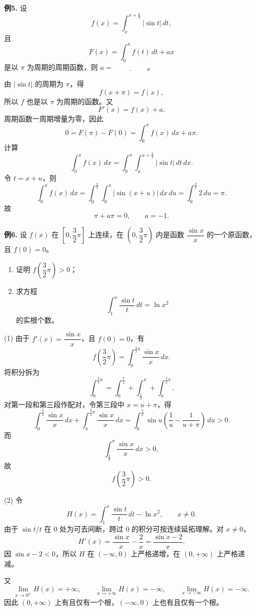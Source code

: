 \begin{problemblock}
\textbf{例5.} 设
\[
f(x)=\int_x^{x+\frac\pi2}|\sin t|\,dt,
\]
且
\[
F(x)=\int_0^x f(t)\,dt+ax
\]
是以 \(\pi\) 为周期的周期函数，则 \(a=\underline{\hspace{2cm}}\)。
\end{problemblock}
\begin{solutionblock}
由 \(|\sin t|\) 的周期为 \(\pi\)，得
\[
f(x+\pi)=f(x),
\]
所以 \(f\) 也是以 \(\pi\) 为周期的函数。又
\[
F'(x)=f(x)+a.
\]
周期函数一周期增量为零，因此
\[
0=F(\pi)-F(0)=\int_0^\pi f(x)\,dx+a\pi.
\]
计算
\[
\int_0^\pi f(x)\,dx
=\int_0^\pi\int_x^{x+\frac\pi2}|\sin t|\,dt\,dx.
\]
令 \(t=x+u\)，则
\[
\int_0^\pi f(x)\,dx
=\int_0^{\frac\pi2}\int_0^\pi|\sin(x+u)|\,dx\,du
=\int_0^{\frac\pi2}2\,du=\pi.
\]
故
\[
\pi+a\pi=0,\qquad a=-1.
\]
\end{solutionblock}

\begin{problemblock}
\textbf{例6.} 设 \(f(x)\) 在 \(\left[0,\dfrac32\pi\right]\) 上连续，在 \(\left(0,\dfrac32\pi\right)\) 内是函数 \(\dfrac{\sin x}{x}\) 的一个原函数，且 \(f(0)=0\)。
\begin{enumerate}[label=(\arabic*), leftmargin=2.2em]
\item 证明 \(f\left(\dfrac32\pi\right)>0\)；
\item 求方程
\[
\int_1^x\frac{\sin t}{t}\,dt=\ln x^2
\]
的实根个数。
\end{enumerate}
\end{problemblock}
\begin{solutionblock}
(1) 由于 \(f'(x)=\dfrac{\sin x}{x}\)，且 \(f(0)=0\)，有
\[
f\left(\frac32\pi\right)
=\int_0^{\frac32\pi}\frac{\sin x}{x}\,dx.
\]
将积分拆为
\[
\int_0^{\frac32\pi}
=\int_0^{\frac\pi2}+\int_{\frac\pi2}^{\pi}+\int_{\pi}^{\frac32\pi}.
\]
对第一段和第三段作配对，令第三段中 \(x=u+\pi\)，得
\[
\int_0^{\frac\pi2}\frac{\sin x}{x}\,dx
+\int_{\pi}^{\frac32\pi}\frac{\sin x}{x}\,dx
=\int_0^{\frac\pi2}\sin u\left(\frac1u-\frac1{u+\pi}\right)\,du>0.
\]
而
\[
\int_{\frac\pi2}^{\pi}\frac{\sin x}{x}\,dx>0,
\]
故
\[
f\left(\frac32\pi\right)>0.
\]

(2) 令
\[
H(x)=\int_1^x\frac{\sin t}{t}\,dt-\ln x^2,\qquad x\ne0.
\]
由于 \(\sin t/t\) 在 \(0\) 处为可去间断，跨过 \(0\) 的积分可按连续延拓理解。对 \(x\ne0\)，
\[
H'(x)=\frac{\sin x}{x}-\frac2x=\frac{\sin x-2}{x}.
\]
因 \(\sin x-2<0\)，所以 \(H\) 在 \((-\infty,0)\) 上严格递增，在 \((0,+\infty)\) 上严格递减。

又
\[
\lim_{x\to0^\pm}H(x)=+\infty,\qquad
\lim_{x\to+\infty}H(x)=-\infty,\qquad
\lim_{x\to-\infty}H(x)=-\infty.
\]
因此 \((0,+\infty)\) 上有且仅有一个根，\((-\infty,0)\) 上也有且仅有一个根。
\end{solutionblock}

